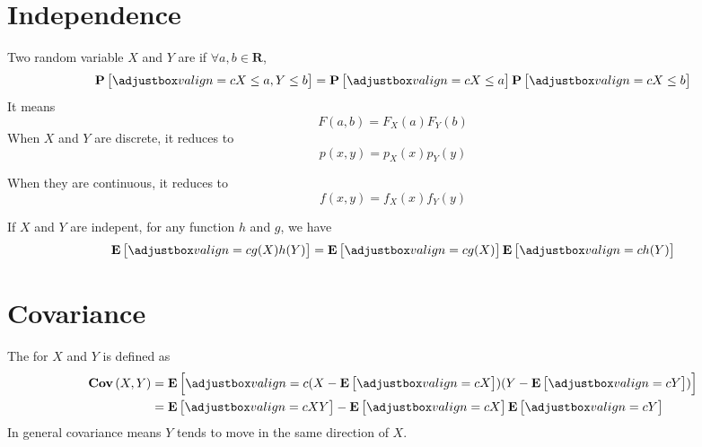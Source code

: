 
\section{Independence}

\begin{definition}
    Two random variable $X$ and $Y$ are  if $\forall a,b \in \mathbf{R}$,
    \begin{equation}
        \probability{ X \leq a , Y \leq b } = \probability{ X \leq a } \probability{ X \leq b }
    \end{equation}
    It means
    \begin{equation}
        F(a,b) = F_X(a) F_Y(b)
    \end{equation}
    When $X$ and $Y$ are discrete, it reduces to
    \begin{equation}
        p(x,y) = p_X(x) p_Y(y)
    \end{equation}
    
    When they are continuous, it reduces to
    \begin{equation}
        f(x,y)=f_X(x) f_Y(y)
    \end{equation}
\end{definition}

\begin{theorem}
    If $X$ and $Y$ are indepent, for any function $h$ and $g$, we have
    \begin{equation}
        \expect{g(X) h(Y)} = \expect{g(X)} \expect{h(Y)}
    \end{equation}    
\end{theorem}

\section{Covariance}

\begin{definition}[covariance]
    The  for $X$ and $Y$ is defined as 
    \begin{equation}
    \begin{aligned}
        \covariance{X}{Y} &= \expect{(X - \expect{X})(Y - \expect{Y})} \\
        &= \expect{XY} - \expect{X} \expect{Y}
    \end{aligned}
    \end{equation}
    In general covariance means $Y$ tends to move in the same direction of $X$.
\end{definition}

